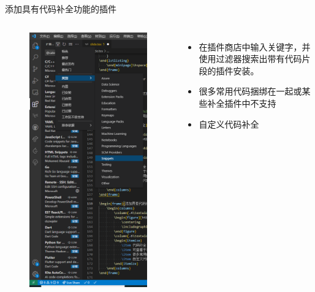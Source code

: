 \documentclass{beamer}
\begin{document}
\begin{frame}{添加具有代码补全功能的插件}
    \begin{columns}
        \begin{figure}[htbp]
            \centering
            \includegraphics[scale=0.24]{pic/plugin_snip.png}
        \end{figure}
        \begin{itemize}
            \item 在插件商店中输入关键字，并使用过滤器搜索出带有代码片段的插件安装。
            \item 很多常用代码捆绑在一起或某些补全插件中不支持
            \item 自定义代码补全
        \end{itemize}


\end{columns}
\end{frame}
\end{document}
